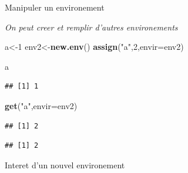 \documentclass[
  ignorenonframetext,
]{beamer}
\newenvironment{Shaded}{\begin{snugshade}}{\end{snugshade}}
\newcommand{\DataTypeTok}[1]{\textcolor[rgb]{0.13,0.29,0.53}{#1}}
\newcommand{\DecValTok}[1]{\textcolor[rgb]{0.00,0.00,0.81}{#1}}
\newcommand{\KeywordTok}[1]{\textcolor[rgb]{0.13,0.29,0.53}{\textbf{#1}}}
\newcommand{\NormalTok}[1]{#1}
\newcommand{\OperatorTok}[1]{\textcolor[rgb]{0.81,0.36,0.00}{\textbf{#1}}}
\newcommand{\StringTok}[1]{\textcolor[rgb]{0.31,0.60,0.02}{#1}}
\begin{document}
\begin{frame}[fragile]{Manipuler un environement}
\protect\hypertarget{manipuler-un-environement}{}

\emph{On peut creer et remplir d'autres environements}

\begin{Shaded}
\begin{Highlighting}[]
\NormalTok{a<-}\DecValTok{1}
\NormalTok{env2<-}\KeywordTok{new.env}\NormalTok{()}
\KeywordTok{assign}\NormalTok{(}\StringTok{"a"}\NormalTok{,}\DecValTok{2}\NormalTok{,}\DataTypeTok{envir=}\NormalTok{env2)}

\NormalTok{a}
\end{Highlighting}
\end{Shaded}

\begin{verbatim}
## [1] 1
\end{verbatim}

\begin{Shaded}
\begin{Highlighting}[]
\KeywordTok{get}\NormalTok{(}\StringTok{"a"}\NormalTok{,}\DataTypeTok{envir=}\NormalTok{env2)}
\end{Highlighting}
\end{Shaded}

\begin{verbatim}
## [1] 2
\end{verbatim}

\begin{Shaded}
\end{Shaded}

\begin{verbatim}
## [1] 2
\end{verbatim}

\end{frame}

\begin{frame}{Interet d'un nouvel environement}
\protect\hypertarget{interet-dun-nouvel-environement}{}

\end{frame}
\end{document}
